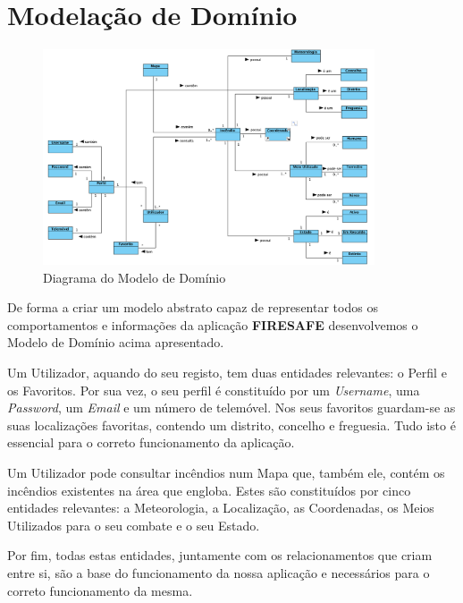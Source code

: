 \documentclass[a4paper,12pt]{scrreprt}
\newcommand{\tab}{
    \hspace{1cm}}
\begin{document}
\chapter{Modelação de Domínio}

\begin{figure}[hbt!]
    \centering
    \includegraphics[width=0.875\textwidth]{images/Fase2/3.ModelacaoDeDominio/modeloDominio.png}
    \caption{Diagrama do Modelo de Domínio}
\end{figure}

\vspace{0.3cm}
\tab De forma a criar um modelo abstrato capaz de representar todos os comportamentos e informações da aplicação \textbf{FIRESAFE} desenvolvemos o Modelo de Domínio acima apresentado.

\tab Um Utilizador, aquando do seu registo, tem duas entidades relevantes: o Perfil e os Favoritos. Por sua vez, o seu perfil é constituído por um \textit{Username}, uma \textit{Password}, um \textit{Email} e um número de telemóvel. Nos seus favoritos guardam-se as suas localizações favoritas, contendo um distrito, concelho e freguesia. Tudo isto é essencial para o correto funcionamento da aplicação.

\tab Um Utilizador pode consultar incêndios num Mapa que, também ele, contém os incêndios existentes na área que engloba. Estes são constituídos por cinco entidades relevantes: a Meteorologia, a Localização, as Coordenadas, os Meios Utilizados para o seu combate e o seu Estado. 

\tab Por fim, todas estas entidades, juntamente com os relacionamentos que criam entre si, são a base do funcionamento da nossa aplicação e necessários para o correto funcionamento da mesma.
\end{document}
